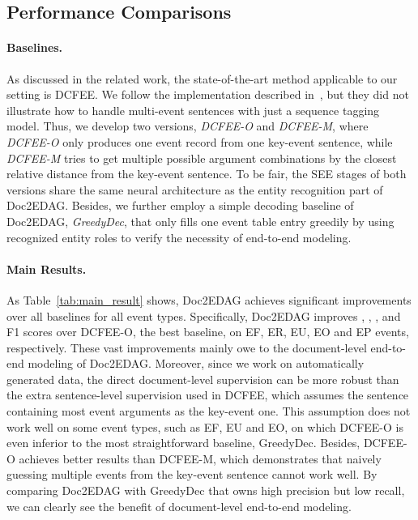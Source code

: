 \documentclass[11pt,a4paper]{article}
\begin{document}
\subsection{Performance Comparisons}
\paragraph{Baselines.}
As discussed in the related work, the state-of-the-art method applicable to our setting is DCFEE.
We follow the implementation described in~\cite{yang2018dcfee},
but they did not illustrate how to handle multi-event sentences with just a sequence tagging model.
Thus, we develop two versions, \textit{DCFEE-O} and \textit{DCFEE-M},
where \textit{DCFEE-O} only produces one event record from one key-event sentence,
while \textit{DCFEE-M} tries to get multiple possible argument combinations by the closest relative distance from the key-event sentence.
To be fair, the SEE stages of both versions share the same neural architecture as the entity recognition part of Doc2EDAG.
Besides, we further employ a simple decoding baseline of Doc2EDAG, \textit{GreedyDec},
that only fills one event table entry greedily by using recognized entity roles to verify the necessity of end-to-end modeling.

\paragraph{Main Results.}
As Table~\ref{tab:main_result} shows, Doc2EDAG achieves significant improvements over all baselines for all event types.
Specifically, Doc2EDAG improves , , ,  and  F1 scores over DCFEE-O, the best baseline, on EF, ER, EU, EO and EP events, respectively.
These vast improvements mainly owe to the document-level end-to-end modeling of Doc2EDAG.
Moreover, since we work on automatically generated data,
the direct document-level supervision can be more robust than the extra sentence-level supervision used in DCFEE,
which assumes the sentence containing most event arguments as the key-event one.
This assumption does not work well on some event types,
such as EF, EU and EO,
on which DCFEE-O is even inferior to the most straightforward baseline, GreedyDec.
Besides, DCFEE-O achieves better results than DCFEE-M, which demonstrates that naively guessing multiple events from the key-event sentence cannot work well.
By comparing Doc2EDAG with GreedyDec that owns high precision but low recall,
we can clearly see the benefit of document-level end-to-end modeling.
\end{document}
